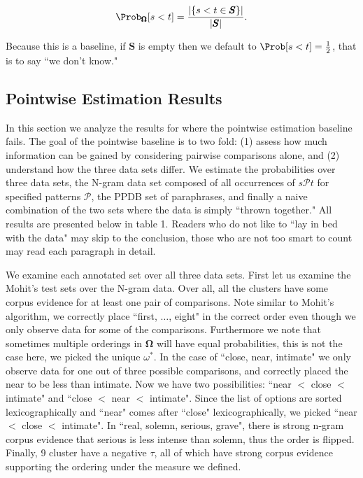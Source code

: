 \begin{equation*}
	\Prob_{\pmb{\Omega}}[ s < t ] = \frac{|\{ s < t \in \pmb{S} \}|}{|\pmb{S}|}.
\end{equation*}

Because this is a baseline, if $\pmb{S}$ is empty then we default to $\Prob[ s < t ] = \frac{1}{2}$, that is to say ``we don't know." 


\subsection{Pointwise Estimation Results}

In this section we analyze the results for where the pointwise estimation baseline fails. The goal of the pointwise baseline is to two fold: (1) assess how much information can be gained by considering pairwise comparisons alone, and (2) understand how the three data sets differ. We estimate the probabilities over three data sets, the N-gram data set composed of all occurrences of $s \mathcal{P} t$ for specified patterns $\mathcal{P}$, the PPDB set of paraphrases, and finally a naive combination of the two sets where the data is simply ``thrown together." All results are presented below in table 1. Readers who do not like to ``lay in bed with the data" may skip to the conclusion, those who are not too smart to count may read each paragraph in detail.

We examine each annotated set over all three data sets. First let us examine the Mohit's test sets over the N-gram data. Over all, all the clusters have some corpus evidence for at least one pair of comparisons. Note similar to Mohit's algorithm, we correctly place ``first, $\ldots$, eight" in the correct order even though we only observe data for some of the comparisons. Furthermore we note that sometimes multiple orderings in $\pmb{\Omega}$ will have equal probabilities, this is not the case here, we picked the unique $\omega^{*}$. In the case of ``close, near, intimate" we only observe data for one out of three possible comparisons, and correctly placed the near to be less than intimate. Now we have two possibilities: ``near $<$ close $<$ intimate" and ``close $<$ near $<$ intimate". Since the list of options are sorted lexicographically and ``near" comes after ``close" lexicographically, we picked ``near $<$ close $<$ intimate". In ``real, solemn, serious, grave", there is strong n-gram corpus evidence that serious is less intense than solemn, thus the order is flipped. Finally, 9 cluster have a negative $\tau$, all of which have strong corpus evidence supporting the ordering under the measure we defined. 

